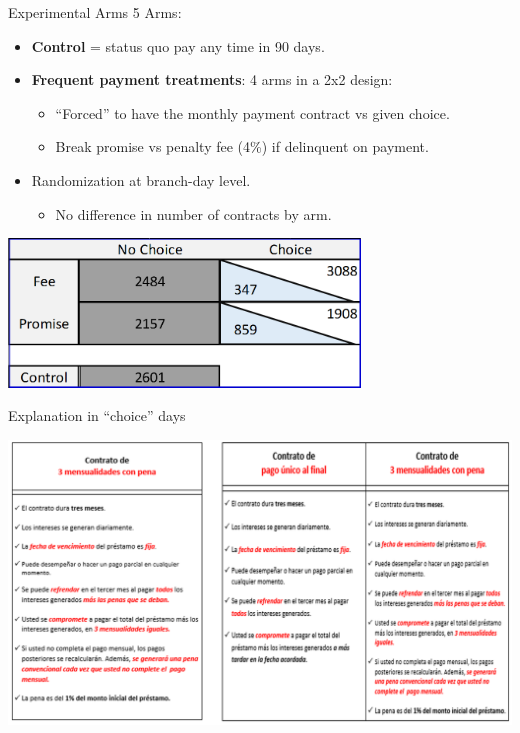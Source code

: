 \documentclass[9pt]{beamer}
\begin{document}
\begin{frame}{Experimental Arms}
     5 Arms:
        \begin{itemize}
            \item \textbf{Control} = status quo pay any time in 90 days.
            \vfill
            \item \textbf{Frequent payment treatments}: 4 arms in a 2x2 design: 
            \vfill
            \begin{itemize}
                \item ``Forced'' to have the monthly payment contract vs given choice.
                \vfill
                \item  Break promise vs penalty fee (4\%) if delinquent on payment.
            \end{itemize}
            \vfill
            \item Randomization at branch-day level.
                \begin{itemize}
                    \item No difference in number of contracts by arm.
                \end{itemize}
        \end{itemize}
    \vfill
    \begin{center}
        \centering
        \includegraphics[width=0.70\textwidth]{Figuras/exp_arms.PNG}
    \end{center}
\end{frame}



\begin{frame}{Explanation in ``choice'' days}
    \begin{center}
        \includegraphics[width=\textwidth]{Figuras/micas.pdf}
    \end{center}
\end{frame}
\end{document}

